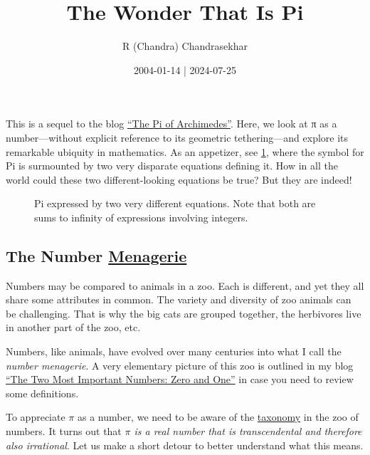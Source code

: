 \documentclass[
  a4paper,
]{article}
\title{The Wonder That Is Pi}
\author{R (Chandra) Chandrasekhar}
\date{2004-01-14 | 2024-07-25}
\begin{document}
\maketitle

\thispagestyle{empty}


This is a sequel to the blog
\href{https://swanlotus.netlify.app/blogs/the-pi-of-archimedes}{``The Pi
of Archimedes''}. Here, we look at π as a number---without explicit
reference to its geometric tethering---and explore its remarkable
ubiquity in mathematics. As an appetizer, see \cref{fig:pi-equations},
where the symbol for Pi is surmounted by two very disparate equations
defining it. How in all the world could these two different-looking
equations be true? But they are indeed!

\begin{figure}
\centering

\caption{Pi expressed by two very different equations. Note that both
are sums to infinity of expressions involving
integers.}\label{fig:pi-equations}
\end{figure}

\subsection{\texorpdfstring{The Number
\href{https://www.thefreedictionary.com/menagerie}{Menagerie}}{The Number Menagerie}}\label{the-number-menagerie}

Numbers may be compared to animals in a zoo. Each is different, and yet
they all share some attributes in common. The variety and diversity of
zoo animals can be challenging. That is why the big cats are grouped
together, the herbivores live in another part of the zoo, etc.

Numbers, like animals, have evolved over many centuries into what I call
the \emph{number menagerie}. A very elementary picture of this zoo is
outlined in my blog
\href{https://swanlotus.netlify.app/blogs/the-two-most-important-numbers-zero-and-one}{``The
Two Most Important Numbers: Zero and One''} in case you need to review
some definitions.

To appreciate \(\pi\) as a number, we need to be aware of the
\href{https://www.britannica.com/science/taxonomy}{taxonomy} in the zoo
of numbers. It turns out that \emph{\(\pi\) is a real number that is
transcendental and therefore also irrational}. Let us make a short
detour to better understand what this means.
\end{document}
